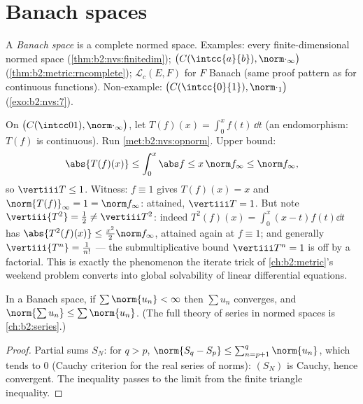 \section{Banach spaces}

\begin{definition}\label{def:b2:nvs:banach}
A \emph{Banach space} is a complete normed
space. Examples: every finite-dimensional normed space
(\cref{thm:b2:nvs:finitedim}); $\bigl(C(\intcc{a}{b}),
\norm\cdot_\infty\bigr)$ (\cref{thm:b2:metric:rncomplete});
$\mathcal{L}_c(E, F)$ for $F$ Banach (same proof pattern as for
continuous functions). Non-example: $\bigl(C(\intcc{0}{1}),
\norm\cdot_1\bigr)$ (\cref{exo:b2:nvs:7}).
\end{definition}

\begin{example}\label{ex:b2:nvs:integrationnorm}
On $\bigl(C(\intcc01), \norm\cdot_\infty\bigr)$, let $T(f)(x) =
\int_0^x f(t)\,\dd t$ (an endomorphism: $T(f)$ is continuous).
Run \cref{met:b2:nvs:opnorm}. Upper bound:
\[
\abs{T(f)(x)} \leq \int_0^x\abs f \leq x\,\norm f_\infty \leq
\norm f_\infty ,
\]
so $\vertiii T \leq 1$. Witness: $f \equiv 1$ gives $T(f)(x) =
x$ and $\norm{T(f)}_\infty = 1 = \norm f_\infty$: attained,
$\vertiii T = 1$. But note $\vertiii{T^2} = \frac12 \neq
\vertiii T^2$: indeed $T^2(f)(x) = \int_0^x(x - t)f(t)\dd t$ has
$\abs{T^2(f)(x)} \leq \frac{x^2}2\norm f_\infty$, attained again
at $f \equiv 1$; and generally $\vertiii{T^n} = \frac1{n!}$ ---
the submultiplicative bound $\vertiii T^n = 1$ is off by a
factorial. This is exactly the phenomenon the iterate trick of
\cref{ch:b2:metric}'s weekend problem converts into global
solvability of linear differential equations.
\end{example}

\begin{theorem}\label{thm:b2:nvs:absoluteconvergence}
In a Banach space, if $\sum \norm{u_n} < \infty$ then $\sum u_n$
converges, and $\norm{\sum u_n} \leq \sum\norm{u_n}$. (The full
theory of series in normed spaces is \cref{ch:b2:series}.)
\end{theorem}

\begin{proof}
Partial sums $S_N$: for $q > p$, $\norm{S_q - S_p} \leq
\sum_{n=p+1}^{q}\norm{u_n}$, which tends to $0$ (Cauchy criterion
for the real series of norms): $(S_N)$ is Cauchy, hence convergent.
The inequality passes to the limit from the finite triangle
inequality.
\end{proof}

